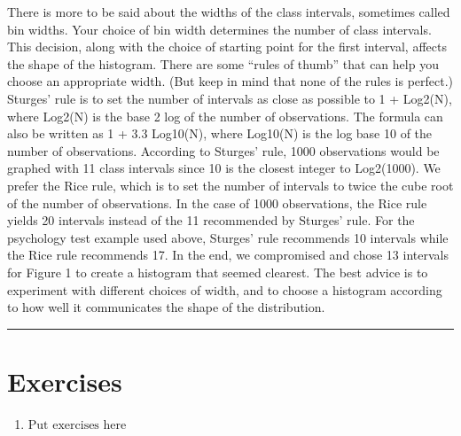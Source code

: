 \documentclass[
]{book}
\providecommand{\tightlist}{%
  \setlength{\itemsep}{0pt}\setlength{\parskip}{0pt}}
\begin{document}
There is more to be said about the widths of the class intervals, sometimes called bin widths. Your choice of bin width determines the number of class intervals. This decision, along with the choice of starting point for the first interval, affects the shape of the histogram. There are some ``rules of thumb'' that can help you choose an appropriate width. (But keep in mind that none of the rules is perfect.) Sturges' rule is to set the number of intervals as close as possible to 1 + Log2(N), where Log2(N) is the base 2 log of the number of observations. The formula can also be written as 1 + 3.3 Log10(N), where Log10(N) is the log base 10 of the number of observations. According to Sturges' rule, 1000 observations would be graphed with 11 class intervals since 10 is the closest integer to Log2(1000). We prefer the Rice rule, which is to set the number of intervals to twice the cube root of the number of observations. In the case of 1000 observations, the Rice rule yields 20 intervals instead of the 11 recommended by Sturges' rule. For the psychology test example used above, Sturges' rule recommends 10 intervals while the Rice rule recommends 17. In the end, we compromised and chose 13 intervals for Figure 1 to create a histogram that seemed clearest. The best advice is to experiment with different choices of width, and to choose a histogram according to how well it communicates the shape of the distribution.

\begin{center}\rule{0.5\linewidth}{0.5pt}\end{center}

\hypertarget{exercises-3}{%
\section{Exercises}\label{exercises-3}}

\begin{enumerate}
\def\labelenumi{\arabic{enumi}.}
\tightlist
\item
  \(\text{Put exercises here}\)
\end{enumerate}

  
\end{document}
